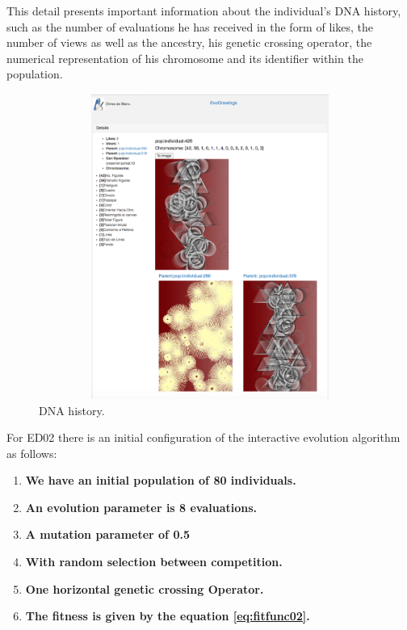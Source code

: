 This detail presents important information about the individual's DNA history,
such as the number of evaluations he has received in the form of likes, the
number of views as well as the ancestry, his genetic crossing operator, the
numerical representation of his chromosome and its identifier within the
population.



\begin{figure}
\captionsetup{justification=centering,margin=2cm}
\centering
\setlength\fboxsep{0pt}
\setlength\fboxrule{0.7pt}
\includegraphics[width=12cm,height=10cm,keepaspectratio]{img/dna.png}
\caption{DNA history.}
\label{fig:dna}
\end{figure}

For ED02 there is an initial configuration of the interactive evolution
algorithm as follows:

\begin{enumerate}
	\item  \textbf{We have an initial population of 80 individuals.}

	\item  \textbf{An evolution parameter is 8 evaluations.}

	\item  \textbf{A mutation parameter of 0.5}
	\item  \textbf{With random selection between competition.}
	\item  \textbf{One horizontal genetic crossing Operator.}
	\item  \textbf{The fitness is given by the equation \ref{eq:fitfunc02}.}
\end{enumerate}

